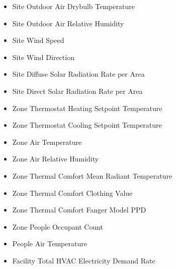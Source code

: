 \documentclass[12pt]{article}
\begin{document}
\begin{multicols}{2}
\begin{itemize}
    \item Site Outdoor Air Drybulb Temperature
    \item Site Outdoor Air Relative Humidity
    \item Site Wind Speed
    \item Site Wind Direction
    \item Site Diffuse Solar Radiation Rate per Area
    \item Site Direct Solar Radiation Rate per Area
    \item Zone Thermostat Heating Setpoint Temperature
    \item Zone Thermostat Cooling Setpoint Temperature
    \item Zone Air Temperature
    \item Zone Air Relative Humidity
    \item Zone Thermal Comfort Mean Radiant Temperature
    \item Zone Thermal Comfort Clothing Value
    \item Zone Thermal Comfort Fanger Model PPD
    \item Zone People Occupant Count
    \item People Air Temperature
    \item Facility Total HVAC Electricity Demand Rate
\end{itemize}
\end{multicols}
\end{document}
